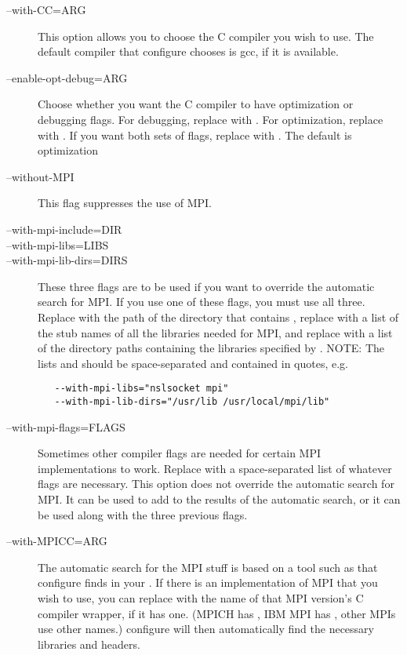 \begin{description}

\item[--with-CC=ARG] This option allows you to choose the C compiler
you wish to use.  The default compiler that configure chooses is gcc,
if it is available.

\item[--enable-opt-debug=ARG] Choose whether you want the C compiler
to have optimization or debugging flags.  For debugging, replace
 with .  For optimization, replace  with
.  If you want both sets of flags, replace  with
.  The default is optimization

\item[--without-MPI] This flag suppresses the use of MPI.

\item[--with-mpi-include=DIR]
\item[--with-mpi-libs=LIBS]
\item[--with-mpi-lib-dirs=DIRS] These three flags are to be used if
you want to override the automatic search for MPI.  If you use one of
these flags, you must use all three.  Replace  with the path
of the directory that contains , replace  with a
list of the stub names of all the libraries needed for MPI, and
replace  with a list of the directory paths containing the
libraries specified by .  NOTE: The lists  and
 should be space-separated and contained in quotes, e.g.
\begin{verbatim}
   --with-mpi-libs="nslsocket mpi"
   --with-mpi-lib-dirs="/usr/lib /usr/local/mpi/lib"
\end{verbatim}

\item[--with-mpi-flags=FLAGS] Sometimes other compiler flags are
needed for certain MPI implementations to work.  Replace 
with a space-separated list of whatever flags are necessary.  This
option does not override the automatic search for MPI.  It can be used
to add to the results of the automatic search, or it can be used along
with the three previous flags.

\item[--with-MPICC=ARG] The automatic search for the MPI stuff is
based on a tool such as  that configure finds in your
.  If there is an implementation of MPI that you wish to
use, you can replace  with the name of that MPI version's C
compiler wrapper, if it has one.  (MPICH has , IBM MPI has
, other MPIs use other names.)  configure will then
automatically find the necessary libraries and headers.

\end{description}

